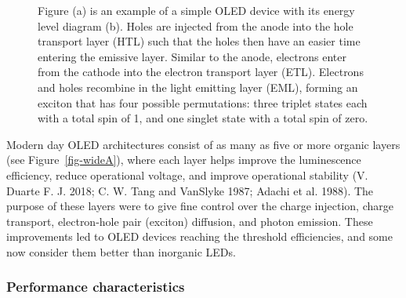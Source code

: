\documentclass[
  letterpaper,
  DIV=11,
  numbers=noendperiod,
  oneside]{scrreprt}
\begin{document}
\begin{figure}
\begin{minipage}[t]{0.50\linewidth}
{{}

}

\subcaption{\label{fig-wideB}}
\end{minipage}%

\caption{\label{fig-elephants}Figure (a) is an example of a simple OLED
device with its energy level diagram (b). Holes are injected from the
anode into the hole transport layer (HTL) such that the holes then have
an easier time entering the emissive layer. Similar to the anode,
electrons enter from the cathode into the electron transport layer
(ETL). Electrons and holes recombine in the light emitting layer (EML),
forming an exciton that has four possible permutations: three triplet
states each with a total spin of 1, and one singlet state with a total
spin of zero.}

\end{figure}

Modern day OLED architectures consist of as many as five or more organic
layers (see Figure~\ref{fig-wideA}), where each layer helps improve the
luminescence efficiency, reduce operational voltage, and improve
operational stability (V. Duarte F. J. 2018; C. W. Tang and VanSlyke
1987; Adachi et al. 1988). The purpose of these layers were to give fine
control over the charge injection, charge transport, electron-hole pair
(exciton) diffusion, and photon emission. These improvements led to OLED
devices reaching the threshold efficiencies, and some now consider them
better than inorganic LEDs.

\hypertarget{performance-characteristics}{%
\subsubsection{Performance
characteristics}\label{performance-characteristics}}
\end{document}
